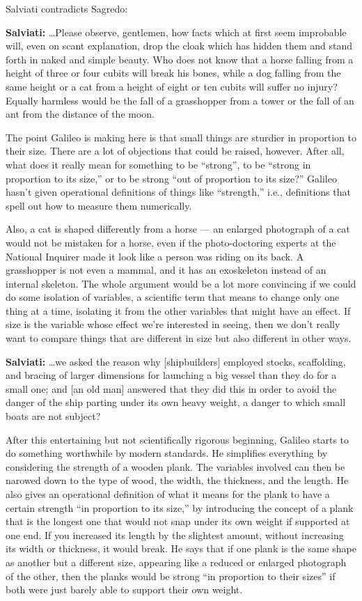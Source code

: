\noindent Salviati contradicts Sagredo:

\textbf{Salviati:} \ldots Please observe, gentlemen, how facts which at
first seem improbable will, even on scant explanation, drop
the cloak which has hidden them and stand forth in naked and
simple beauty. Who does not know that a horse falling from a
height of three or four cubits will break his bones, while a
dog falling from the same height or a cat from a height of
eight or ten cubits will suffer no injury? Equally harmless
would be the fall of a grasshopper from a tower or the fall
of an ant from the distance of the moon.



The point Galileo is making here is that small things are
sturdier in proportion to their size. There are a lot of
objections that could be raised, however. After all, what
does it really mean for something to be ``strong'', to be
``strong in proportion to its size,'' or to be strong ``out
of proportion to its size?'' Galileo hasn't given
operational definitions of things like ``strength,'' i.e.,
definitions that spell out how to measure them numerically.

Also, a cat is shaped differently from a horse --- an
enlarged photograph of a cat would not be mistaken for a
horse, even if the photo-doctoring experts at the National
Inquirer made it look like a person was riding on its back.
A grasshopper is not even a mammal, and it has an exoskeleton
instead of an internal skeleton. The whole argument would be
a lot more convincing if we could do some isolation of
variables, a scientific term that means to change only one
thing at a time, isolating it from the other variables that
might have an effect. If size is the variable whose effect
we're interested in seeing, then we don't really want to
compare things that are different in size but also
different in other ways.


\textbf{Salviati:} \ldots we asked the reason why [shipbuilders] employed
stocks, scaffolding, and bracing of larger dimensions for
launching a big vessel than they do for a small one; and [an
old man] answered that they did this in order to avoid the
danger of the ship parting under its own heavy weight, a
danger to which small boats are not subject?


After this entertaining but not scientifically rigorous
beginning, Galileo starts to do something worthwhile by
modern standards. He simplifies everything by considering
the strength of a wooden plank. The variables involved can
then be narowed down to the type of wood, the width, the
thickness, and the length. He also gives an operational
definition of what it means for the plank to have a certain
strength ``in proportion to its size,'' by introducing the
concept of a plank that is the longest one that would not
snap under its own weight if supported at one end. If you
increased its length by the slightest amount, without
increasing its width or thickness, it would break. He says
that if one plank is the same shape as another but a
different size, appearing like a reduced or enlarged
photograph of the other, then the planks would be strong
``in proportion to their sizes'' if both were just barely
able to support their own weight.


